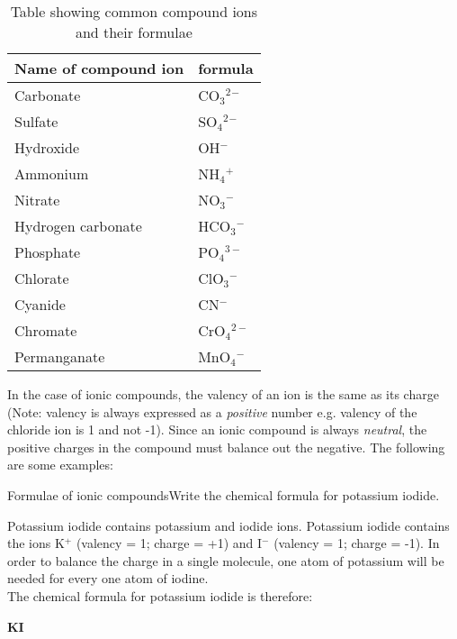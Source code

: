 \begin{table}[h]
\caption{Table showing common compound ions and their formulae}
\label{tab:ac:wcf:compound ion charges}
\begin{center}
\begin{tabular}{|l|l|}\hline
\textbf{Name of compound ion} & \textbf{formula}\\\hline
Carbonate & CO$_3$$^2$$^-$\\\hline
Sulfate & SO$_4$$^2$$^-$\\\hline
Hydroxide & OH$^-$\\\hline
Ammonium & NH$_{4}$$^{+}$\\\hline
Nitrate & NO$_{3}$$^{-}$\\\hline
Hydrogen carbonate & HCO$_3$$^-$\\\hline
Phosphate & PO$_{4}$$^{3-}$\\\hline
Chlorate & ClO$_{3}$$^{-}$\\\hline
Cyanide & CN$^{-}$\\\hline
Chromate & CrO$_{4}$$^{2-}$\\\hline
Permanganate & MnO$_{4}$$^{-}$\\\hline
\end{tabular}
\end{center}
\end{table}

In the case of ionic compounds, the valency of an ion is the same as its charge (Note: valency is always expressed as a
\textit{positive} number e.g. valency of the chloride ion is 1 and not -1). Since an ionic compound is always \textit{neutral},
the positive charges in the compound must balance out the negative. The following are some examples:\\

\begin{wex}{Formulae of ionic compounds}{Write the chemical formula for potassium iodide.\\}

{
Potassium iodide contains potassium and iodide ions.
Potassium iodide contains the ions K$^+$ (valency = 1; charge = +1) and I$^-$ (valency = 1; charge = -1). In order to balance the charge in a single molecule, one atom of potassium will be needed for every one atom of iodine.
\\

The chemical formula for potassium iodide is therefore:

\begin{center}
\textbf{KI}
\end{center}}
\end{wex}

